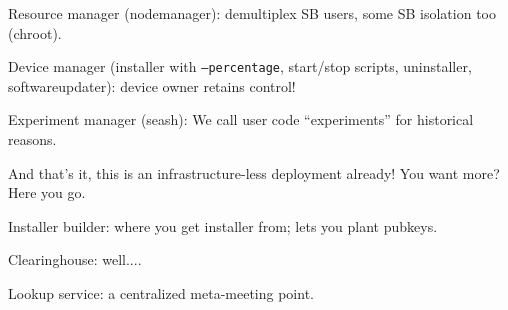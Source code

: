 Resource manager (nodemanager): demultiplex SB users, some SB isolation too (chroot).

Device manager (installer with \texttt{--percentage}, start/stop scripts, uninstaller, softwareupdater): device owner retains control!

Experiment manager (seash): We call user code ``experiments'' for historical reasons.

And that's it, this is an infrastructure-less deployment already!
You want more? Here you go.

Installer builder: where you get installer from; lets you plant pubkeys.

Clearinghouse: well....

Lookup service: a centralized meta-meeting point.



